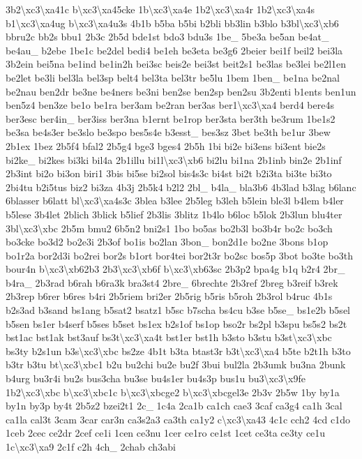 {3b2\textbackslash{}xc3\textbackslash{}xa41c b\textbackslash{}xc3\textbackslash{}xa45cke 1b\textbackslash{}xc3\textbackslash{}xa4e 1b2\textbackslash{}xc3\textbackslash{}xa4r 1b2\textbackslash{}xc3\textbackslash{}xa4s b1\textbackslash{}xc3\textbackslash{}xa4ug b\textbackslash{}xc3\textbackslash{}xa4u3s 4b1b b5ba b5bi b2bli bb3lin b3blo b3bl\textbackslash{}xc3\textbackslash{}xb6 bbru2c bb2s bbu1 2b3c 2b5d bde1st bdo3 bdu3s 1be\-\_\- 5be3a be5an be4at\-\_\- be4au\-\_\- b2ebe 1be1c be2del bedi4 be1eh be3eta be3g6 2beier bei1f beil2 bei3la 3b2ein bei5na be1ind be1in2h bei3sc beis2e bei3st beit2s1 be3las be3lei be2l1en be2let be3li bel3la bel3sp belt4 bel3ta bel3tr be5lu 1bem 1ben\-\_\- be1na be2nal be2nau ben2dr be3ne be4ners be3ni ben2se ben2sp ben2su 3b2enti b1ents ben1un ben5z4 ben3ze be1o be1ra ber3am be2ran ber3as ber1\textbackslash{}xc3\textbackslash{}xa4 berd4 bere4s ber3esc ber4in\-\_\- ber3iss ber3na b1ernt be1rop ber3sta ber3th be3rum 1be1s2 be3sa be4s3er be3slo be3spo bes5s4e b3esst\-\_\- bes3sz 3bet be3th be1ur 3bew 2b1ex 1bez 2b5f4 bfal2 2b5g4 bge3 bges4 2b5h 1bi bi2e bi3ens bi3ent bie2s bi2ke\-\_\- bi2kes bi3ki bil4a 2b1illu bi1l\textbackslash{}xc3\textbackslash{}xb6 bi2lu bi1na 2b1inb bin2e 2b1inf 2b3int bi2o bi3on biri1 3bis bi5se bi2sol bis4s3c bi4st bi2t b2i3ta bi3te bi3to 2bi4tu b2i5tus biz2 bi3za 4b3j 2b5k4 b2l2 2bl\-\_\- b4la\-\_\- bla3b6 4b3lad b3lag b6lanc 6blasser b6latt bl\textbackslash{}xc3\textbackslash{}xa4s3c 3blea b3lee 2b5leg b3leh b5lein ble3l b4lem b4ler b5lese 3b4let 2blich 3blick b5lief 2b3lis 3blitz 1b4lo b6loc b5lok 2b3lun blu4ter 3bl\textbackslash{}xc3\textbackslash{}xbc 2b5m bmu2 6b5n2 bni2s1 1bo bo5as bo2b3l bo3b4r bo2c bo3ch bo3cke bo3d2 bo2e3i 2b3of bo1is bo2lan 3bon\-\_\- bon2d1e bo2ne 3bons b1op bo1r2a bor2d3i bo2rei bor2s b1ort bor4tei bor2t3r bo2sc bos5p 3bot bo3te bo3th bour4n b\textbackslash{}xc3\textbackslash{}xb62b3 2b3\textbackslash{}xc3\textbackslash{}xb6f b\textbackslash{}xc3\textbackslash{}xb63sc 2b3p2 bpa4g b1q b2r4 2br\-\_\- b4ra\-\_\- 2b3rad b6rah b6ra3k bra3st4 2bre\-\_\- 6brechte 2b3ref 2breg b3reif b3rek 2b3rep b6rer b6res b4ri 2b5riem bri2er 2b5rig b5ris b5roh 2b3rol b4ruc 4b1s b2s3ad b3sand bs1ang b5sat2 bsatz1 b5sc b7scha bs4cu b3se b5se\-\_\- bs1e2b b5sel b5sen bs1er b4serf b5ses b5set bs1ex b2s1of bs1op bso2r bs2pl b3spu bs5s2 bs2t bst1ac bst1ak bst3auf bs3t\textbackslash{}xc3\textbackslash{}xa4t bst1er bst1h b3sto b3stu b3st\textbackslash{}xc3\textbackslash{}xbc bs3ty b2s1un b3s\textbackslash{}xc3\textbackslash{}xbc bs2ze 4b1t b3ta btast3r b3t\textbackslash{}xc3\textbackslash{}xa4 b5te b2t1h b3to b3tr b3tu bt\textbackslash{}xc3\textbackslash{}xbc1 b2u bu2chi bu2e bu2f 3bui bul2la 2b3umk bu3na 2bunk b4urg bu3r4i bu2s bus3cha bu3se bu4s1er bu4s3p bus1u bu3\textbackslash{}xc3\textbackslash{}x9fe 1b2\textbackslash{}xc3\textbackslash{}xbc b\textbackslash{}xc3\textbackslash{}xbc1c b\textbackslash{}xc3\textbackslash{}xbcge2 b\textbackslash{}xc3\textbackslash{}xbcgel3e 2b3v 2b5w 1by by1a by1n by3p by4t 2b5z2 bzei2t1 2c\-\_\- 1c4a 2ca1b ca1ch cae3 3caf ca3g4 ca1h 3cal ca1la cal3t 3cam 3car car3n ca3s2a3 ca3th ca1y2 c\textbackslash{}xc3\textbackslash{}xa43 4c1c cch2 4cd c1do 1ceb 2cec ce2dr 2cef ce1i 1cen ce3nu 1cer ce1ro ce1st 1cet ce3ta ce3ty ce1u 1c\textbackslash{}xc3\textbackslash{}xa9 2c1f c2h 4ch\-\_\- 2chab ch3abi }

